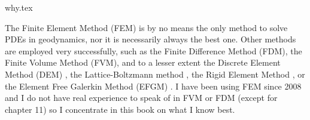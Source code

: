 \begin{flushright} {\tiny {\color{gray} why.tex}} \end{flushright}

The Finite Element Method (FEM) is by no means the only method 
to solve PDEs in geodynamics, nor it is necessarily always the best one.
Other methods are employed very successfully, such as the Finite Difference 
Method (FDM), the Finite Volume Method (FVM), and to a lesser extent
the Discrete Element Method (DEM) \cite{tasy05,egho07,egsc07,funi14}, 
the Lattice-Boltzmann method \cite{hupc08}, the Rigid Element Method \cite{lacj15},  
or the Element Free Galerkin Method (EFGM) \cite{hans03}.
I have been using FEM since 2008 and I do not have real 
experience to speak of in FVM or FDM (except for chapter 11)
so I concentrate in this book 
on what I know best. 


